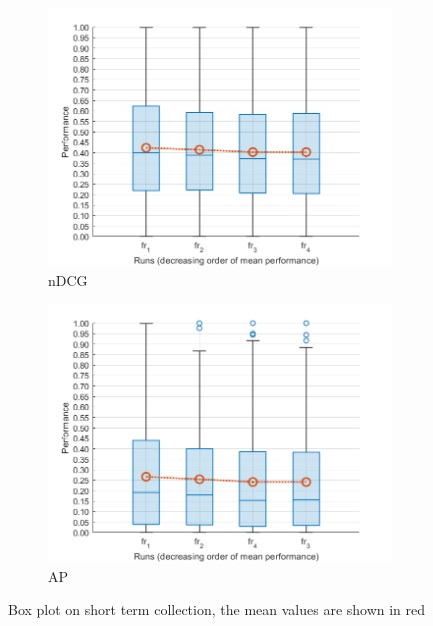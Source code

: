 \begin{figure}[tbp]
     \centering
     \begin{subfigure}[b]{0.45\textwidth}
         \centering
         \includegraphics[width=\textwidth]{figure/short-ndcg-boxplot.png}
         \caption{\ac{nDCG}}
     \end{subfigure}
     \hfill
     \begin{subfigure}[b]{0.45\textwidth}
         \centering
         \includegraphics[width=\textwidth]{figure/short-map-boxplot.png}
         \caption{\ac{AP}}
     \end{subfigure}
        \caption{Box plot on short term collection, the mean values are shown in red}
        \label{fig:short-boxplot}
\end{figure}

